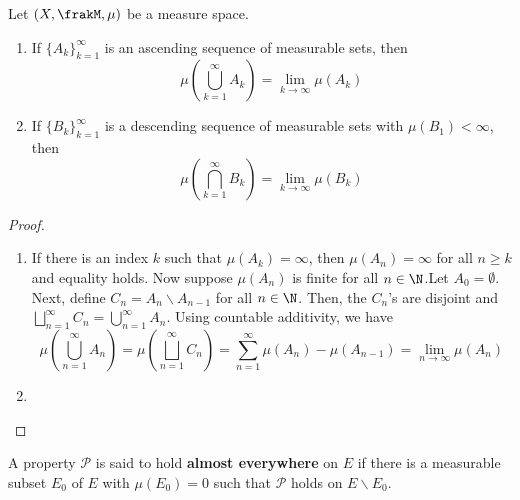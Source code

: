 \begin{proposition}
    Let $(X,\frakM,\mu)$ be a measure space. 
    \begin{enumerate}[label=(\alph*)]
    \item If $\{A_k\}_{k = 1}^\infty$ is an ascending sequence of measurable sets, then 
    \begin{equation*}
        \mu\left(\bigcup_{k=1}^\infty A_k\right) = \lim_{k\to\infty}\mu(A_k)
    \end{equation*}

    \item If $\{B_k\}_{k = 1}^\infty$ is a descending sequence of measurable sets with $\mu(B_1) < \infty$, then 
    \begin{equation*}
        \mu\left(\bigcap_{k = 1}^\infty B_k\right) = \lim_{k\to\infty}\mu(B_k)
    \end{equation*}
    \end{enumerate}
\end{proposition}
\begin{proof}
\hfill 
\begin{enumerate}[label=(\alph*)]
\item If there is an index $k$ such that $\mu(A_k) = \infty$, then $\mu(A_n) = \infty$ for all $n\ge k$ and equality holds. Now suppose $\mu(A_n)$ is finite for all $n\in\N$.Let $A_0 = \emptyset$. Next, define $C_n = A_n\backslash A_{n - 1}$ for all $n\in\N$. Then, the $C_n$'s are disjoint and $\bigsqcup_{n = 1}^\infty C_n = \bigcup_{n = 1}^\infty A_n$. Using countable additivity, we have 
\begin{equation*}
    \mu\left(\bigcup_{n = 1}^\infty A_n\right) = \mu\left(\bigsqcup_{n = 1}^\infty C_n\right) = \sum_{n = 1}^\infty\mu(A_n) - \mu(A_{n - 1}) = \lim_{n\to\infty}\mu(A_n)
\end{equation*}

\item 
\end{enumerate}
\end{proof}

A property $\mathcal P$ is said to hold \textbf{almost everywhere} on $E$ if there is a measurable subset $E_0$ of $E$ with $\mu(E_0) = 0$ such that $\mathcal P$ holds on $E\backslash E_0$.

